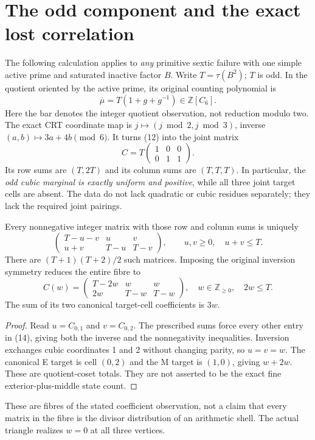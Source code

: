 \section{The odd component and the exact lost correlation}\label{sec:mixed}
The following calculation applies to \emph{any} primitive sextic failure with
one simple active prime and saturated inactive factor $B$. Write $T=\tau(B^2)$;
$T$ is odd. In the quotient oriented by the active prime, its original counting
polynomial is
\[
 \overline\mu=T(1+g+g^{-1})\in\mathbb Z[C_6].              \tag{12}
\]
Here the bar denotes the integer quotient observation, not reduction modulo two.
The exact CRT coordinate map is $j\mapsto(j\bmod2,j\bmod3)$, inverse
$(a,b)\mapsto3a+4b\pmod6$. It turns (12) into the joint matrix
\[
 \boxed{C=T\begin{pmatrix}1&0&0\\0&1&1\end{pmatrix}.}     \tag{13}
\]
Its row sums are $(T,2T)$ and its column sums are $(T,T,T)$. In particular, the
\emph{odd cubic marginal is exactly uniform and positive}, while all three joint
target cells are absent. The data do not lack quadratic or cubic residues
separately; they lack the required joint pairings.

\begin{proposition}
Every nonnegative integer matrix with those row and column sums is uniquely
\[
 \begin{pmatrix}T-u-v&u&v\\u+v&T-u&T-v\end{pmatrix},
 \qquad u,v\ge0,\quad u+v\le T.                          \tag{14}
\]
There are $(T+1)(T+2)/2$ such matrices. Imposing the original inversion symmetry
reduces the entire fibre to
\[
 \boxed{C(w)=\begin{pmatrix}T-2w&w&w\\2w&T-w&T-w\end{pmatrix},
 \quad w\in\mathbb Z_{\ge0},\quad2w\le T.}                \tag{15}
\]
The sum of its two canonical target-cell coefficients is $3w$.
\end{proposition}
\begin{proof}
Read $u=C_{0,1}$ and $v=C_{0,2}$. The prescribed sums force every other entry in
(14), giving both the inverse and the nonnegativity inequalities. Inversion
exchanges cubic coordinates 1 and 2 without changing parity, so $u=v=w$.
The canonical E target is cell $(0,2)$ and the M target is $(1,0)$, giving $w+2w$. These are quotient-coset totals. They are not asserted to be
the exact fine exterior-plus-middle state count.
\end{proof}
These are fibres of the stated coefficient observation, not a claim that every
matrix in the fibre is the divisor distribution of an arithmetic shell. The
actual triangle realizes $w=0$ at all three vertices.

